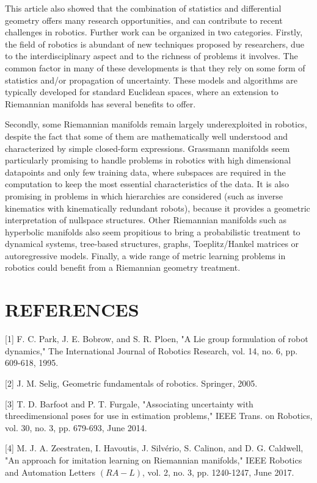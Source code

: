 \documentclass[10pt]{article}
\begin{document}
This article also showed that the combination of statistics and differential geometry offers many research opportunities, and can contribute to recent challenges in robotics. Further work can be organized in two categories. Firstly, the field of robotics is abundant of new techniques proposed by researchers, due to the interdisciplinary aspect and to the richness of problems it involves. The common factor in many of these developments is that they rely on some form of statistics and/or propagation of uncertainty. These models and algorithms are typically developed for standard Euclidean spaces, where an extension to Riemannian manifolds has several benefits to offer.

Secondly, some Riemannian manifolds remain largely underexploited in robotics, despite the fact that some of them are mathematically well understood and characterized by simple closed-form expressions. Grassmann manifolds seem particularly promising to handle problems in robotics with high dimensional datapoints and only few training data, where subspaces are required in the computation to keep the most essential characteristics of the data. It is also promising in problems in which hierarchies are considered (such as inverse kinematics with kinematically redundant robots), because it provides a geometric interpretation of nullspace structures. Other Riemannian manifolds such as hyperbolic manifolds also seem propitious to bring a probabilistic treatment to dynamical systems, tree-based structures, graphs, Toeplitz/Hankel matrices or autoregressive models. Finally, a wide range of metric learning problems in robotics could benefit from a Riemannian geometry treatment.

\section{REFERENCES}
[1] F. C. Park, J. E. Bobrow, and S. R. Ploen, "A Lie group formulation of robot dynamics," The International Journal of Robotics Research, vol. 14, no. 6, pp. 609-618, 1995.

[2] J. M. Selig, Geometric fundamentals of robotics. Springer, 2005.

[3] T. D. Barfoot and P. T. Furgale, "Associating uncertainty with threedimensional poses for use in estimation problems," IEEE Trans. on Robotics, vol. 30, no. 3, pp. 679-693, June 2014.

[4] M. J. A. Zeestraten, I. Havoutis, J. Silvério, S. Calinon, and D. G. Caldwell, "An approach for imitation learning on Riemannian manifolds," IEEE Robotics and Automation Letters $(R A-L)$, vol. 2, no. 3, pp. 1240-1247, June 2017.
\end{document}
